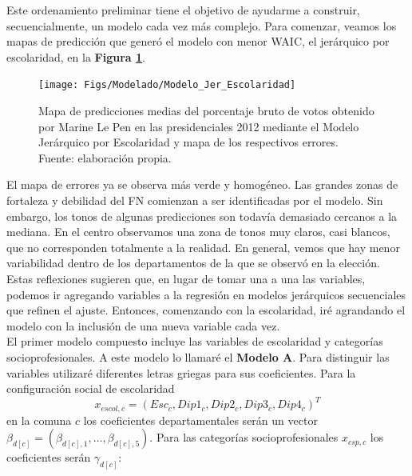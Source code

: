 Este ordenamiento preliminar tiene el objetivo de ayudarme a construir, secuencialmente, un modelo cada vez más complejo. Para comenzar, veamos los mapas de predicción que generó el modelo con menor WAIC, el jerárquico por escolaridad, en la \textbf{Figura \ref{fig:Modelo_Jer_Escolaridad}}.

\begin{figure}[h]
	\centering
	\texttt{[image: Figs/Modelado/Modelo\_Jer\_Escolaridad]}
	\caption{Mapa de predicciones medias del porcentaje bruto de votos obtenido por Marine Le Pen en las presidenciales 2012 mediante el Modelo Jerárquico por Escolaridad y mapa de los respectivos errores. Fuente: elaboración propia.}
	\label{fig:Modelo_Jer_Escolaridad}
\end{figure}

El mapa de errores ya se observa más verde y homogéneo. Las grandes zonas de fortaleza y debilidad del FN comienzan a ser identificadas por el modelo. Sin embargo, los tonos de algunas predicciones son todavía demasiado cercanos a la mediana. En el centro observamos una zona de tonos muy claros, casi blancos, que no corresponden totalmente a la realidad. En general, vemos que hay menor variabilidad dentro de los departamentos de la que se observó en la elección.\\ 

Estas reflexiones sugieren que, en lugar de tomar una a una las variables, podemos ir agregando variables a la regresión en modelos jerárquicos secuenciales que refinen el ajuste. Entonces, comenzando con la escolaridad, iré agrandando el modelo con la inclusión de una nueva variable cada vez.\\ 

El primer modelo compuesto incluye las variables de escolaridad y categorías socioprofesionales. A este modelo lo llamaré el \textbf{Modelo A}. Para distinguir las variables utilizaré diferentes letras griegas para sus coeficientes. Para la configuración social de escolaridad 
\[x_{escol,c} = (Esc_c,Dip1_c,Dip2_c,Dip3_c,Dip4_c)^T\]
en la comuna $c$ los coeficientes departamentales serán un vector $\beta_{d[c]} = (\beta_{d[c],1},\dots,\beta_{d[c],5})$. Para las categorías socioprofesionales $x_{csp,c}$ los coeficientes serán $\gamma_{d[c]}$:

